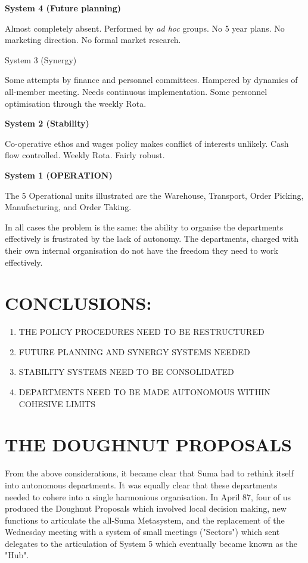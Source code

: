 \textbf{System 4 (Future planning)}

Almost completely absent. Performed by \textit{ad hoc} groups. No 5 year plans. No marketing direction. No formal market research.

System 3 (Synergy)

Some attempts by finance and personnel committees. Hampered by dynamics of all-member meeting. Needs continuous implementation. Some personnel optimisation through the weekly Rota.

\textbf{System 2 (Stability)}

Co-operative ethos and wages policy makes conflict of interests unlikely. Cash flow controlled. Weekly Rota. Fairly robust.

\textbf{System 1 (OPERATION)}

The 5 Operational units illustrated are the Warehouse, Transport, Order Picking, Manufacturing, and Order Taking.

In all cases the problem is the same: the ability to organise the departments effectively is frustrated by the lack of autonomy. The departments, charged with their own internal organisation do not have the freedom they need to work effectively.

\section*{CONCLUSIONS:}
\begin{enumerate}
  \item THE POLICY PROCEDURES NEED TO BE RESTRUCTURED

  \item FUTURE PLANNING AND SYNERGY SYSTEMS NEEDED

  \item STABILITY SYSTEMS NEED TO BE CONSOLIDATED

  \item DEPARTMENTS NEED TO BE MADE AUTONOMOUS WITHIN COHESIVE LIMITS

\end{enumerate}

\section*{THE DOUGHNUT PROPOSALS}
From the above considerations, it became clear that Suma had to rethink itself into autonomous departments. It was equally clear that these departments needed to cohere into a single harmonious organisation. In April 87, four of us produced the Doughnut Proposals which involved local decision making, new functions to articulate the all-Suma Metasystem, and the replacement of the Wednesday meeting with a system of small meetings ("Sectors") which sent delegates to the articulation of System 5 which eventually became known as the "Hub".

